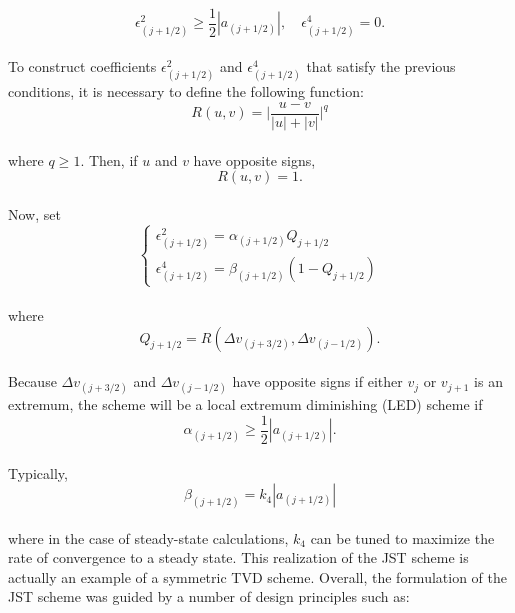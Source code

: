\documentclass[a5paper]{sapthesis}
\begin{document}
	\begin{equation}
		\epsilon^2_{(j+1/2)} \geq \dfrac{1}{2}|a_{(j+1/2)}|, \quad \epsilon^4_{(j+1/2)} = 0.
	\end{equation}
	\\
	To construct coefficients $\epsilon^2_{(j+1/2)}$ and $\epsilon^4_{(j+1/2)}$ that satisfy the previous conditions, it is necessary to define the following function:
	\begin{equation}
		R(u,v) = \bigg|\dfrac{u-v}{|u|+|v|} \bigg|^q
	\end{equation}
	\\
	where $q\geq1$. Then, if $u$ and $v$ have opposite signs, 
	\begin{equation}
		R(u,v) = 1.
	\end{equation}
	\\
	Now, set
	\begin{equation}
		\begin{cases}
			\epsilon^2_{(j+1/2)} = \alpha_{(j+1/2)}Q_{j+1/2} \\[1mm]
			\epsilon^4_{(j+1/2)} = \beta_{(j+1/2)}(1-Q_{j+1/2})
		\end{cases}
	\end{equation} 
	\\
	where 
	\begin{equation}
		Q_{j+1/2} = R(\Delta v_{(j+3/2)}, \Delta v_{(j-1/2)}).
	\end{equation}
	\\
	Because $\Delta v_{(j+3/2)}$ and $\Delta v_{(j-1/2)}$ have opposite signs if either $v_j$ or $v_{j+1}$ is an extremum, the scheme will be a local extremum diminishing (LED) scheme if
	\begin{equation}
		\alpha_{(j+1/2)} \geq \dfrac{1}{2}|a_{(j+1/2)}|.
	\end{equation}
	\\
	Typically, 
	\begin{equation}
		\beta_{(j+1/2)} = \textit{k}_4|a_{(j+1/2)}|
	\end{equation}
	\\
	where in the case of steady-state calculations, $\textit{k}_4$ can be tuned to maximize the rate of convergence to a steady state.
	This realization of the JST scheme is actually an example of a symmetric TVD scheme.
	Overall, the formulation of the JST scheme was guided by a number of design principles such as: 
	
\end{document}
